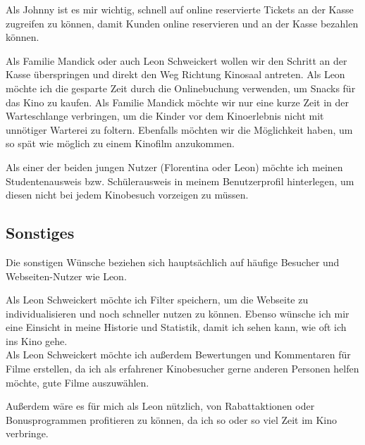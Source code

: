 Als Johnny ist es mir wichtig, schnell auf online reservierte Tickets an der Kasse zugreifen zu können, damit Kunden online reservieren und an der Kasse bezahlen können.

Als Familie Mandick oder auch Leon Schweickert wollen wir den Schritt an der Kasse überspringen und direkt den Weg Richtung Kinosaal antreten.
Als Leon möchte ich die gesparte Zeit durch die Onlinebuchung verwenden, um Snacks für das Kino zu kaufen.
Als Familie Mandick möchte wir nur eine kurze Zeit in der Warteschlange verbringen, um die Kinder vor dem Kinoerlebnis nicht mit unnötiger Warterei zu foltern.
Ebenfalls möchten wir die Möglichkeit haben, um so spät wie möglich zu einem Kinofilm anzukommen.

Als einer der beiden jungen Nutzer (Florentina oder Leon) möchte ich meinen Studentenausweis bzw. Schülerausweis in meinem Benutzerprofil hinterlegen, um diesen nicht bei jedem Kinobesuch vorzeigen zu müssen.

\subsection{Sonstiges}
Die sonstigen Wünsche beziehen sich hauptsächlich auf häufige Besucher und Webseiten-Nutzer wie Leon.

Als Leon Schweickert möchte ich Filter speichern, um die Webseite zu individualisieren und noch schneller nutzen zu können.
Ebenso wünsche ich mir eine Einsicht in meine Historie und Statistik, damit ich sehen kann, wie oft ich ins Kino gehe. \\
Als Leon Schweickert möchte ich außerdem Bewertungen und Kommentaren für Filme erstellen, da ich als erfahrener Kinobesucher gerne anderen Personen helfen möchte, gute Filme auszuwählen.

Außerdem wäre es für mich als Leon nützlich, von Rabattaktionen oder Bonusprogrammen profitieren zu können, da ich so oder so viel Zeit im Kino verbringe.

